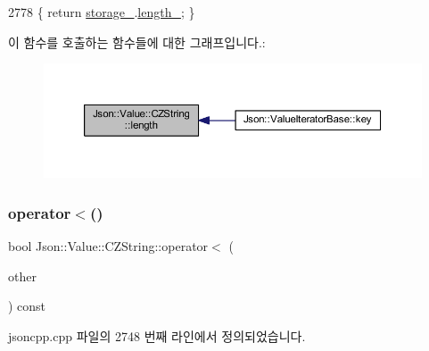\begin{DoxyCode}
2778 \{ \textcolor{keywordflow}{return} \hyperlink{class_json_1_1_value_1_1_c_z_string_a17c92f0f089a4314e3b1d5695dc1a851}{storage\_}.\hyperlink{struct_json_1_1_value_1_1_c_z_string_1_1_string_storage_a165d865c44e6471d34668eeb4f15b140}{length\_}; \}
\end{DoxyCode}
이 함수를 호출하는 함수들에 대한 그래프입니다.\+:\nopagebreak
\begin{figure}[H]
\begin{center}
\leavevmode
\includegraphics[width=350pt]{class_json_1_1_value_1_1_c_z_string_aa7ee665d162c1f33b3ec818e289d8a5e_icgraph}
\end{center}
\end{figure}
\mbox{\label{class_json_1_1_value_1_1_c_z_string_ae023bb91b4b4520c82d5e6e4da8c310a}} 
\subsubsection{\texorpdfstring{operator$<$()}{operator<()}}
{\footnotesize\ttfamily bool Json\+::\+Value\+::\+C\+Z\+String\+::operator$<$ (\begin{DoxyParamCaption}\item[{\hyperlink{class_json_1_1_value_1_1_c_z_string}{C\+Z\+String} const \&}]{other }\end{DoxyParamCaption}) const}



jsoncpp.\+cpp 파일의 2748 번째 라인에서 정의되었습니다.


